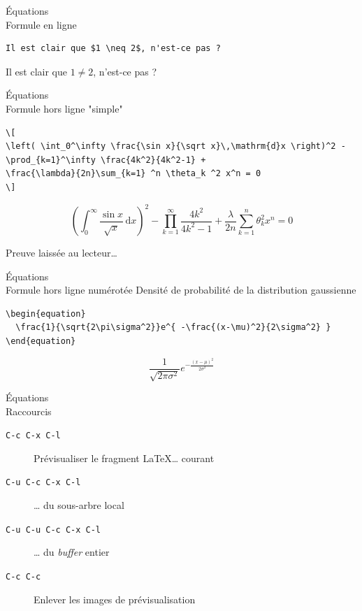 \documentclass[presentation,t,hideothersubsections]{beamer}
\begin{document}
\begin{frame}[fragile,label=sec-3-1-1]{Équations \\ Formule en ligne}
 \lstset{language=org,numbers=none}
\begin{lstlisting}
Il est clair que $1 \neq 2$, n'est-ce pas ?
\end{lstlisting}

Il est clair que $1 \neq 2$, n'est-ce pas ?
\end{frame}
\begin{frame}[fragile,label=sec-3-1-2]{Équations \\ Formule hors ligne "simple"}
 \lstset{language=org,numbers=none}
\begin{lstlisting}
\[
\left( \int_0^\infty \frac{\sin x}{\sqrt x}\,\mathrm{d}x \right)^2 -
\prod_{k=1}^\infty \frac{4k^2}{4k^2-1} +
\frac{\lambda}{2n}\sum_{k=1} ^n \theta_k ^2 x^n = 0
\]
\end{lstlisting}

\[
\left( \int_0^\infty \frac{\sin x}{\sqrt x}\,\mathrm{d}x \right)^2 -
\prod_{k=1}^\infty \frac{4k^2}{4k^2-1} +
\frac{\lambda}{2n}\sum_{k=1} ^n \theta_k ^2 x^n = 0
\]

Preuve laissée au lecteur\ldots{}
\end{frame}
\begin{frame}[fragile,label=sec-3-1-3]{Équations \\ Formule hors ligne numérotée}
 Densité de probabilité de la distribution gaussienne

\lstset{language=org,numbers=none}
\begin{lstlisting}
\begin{equation}
  \frac{1}{\sqrt{2\pi\sigma^2}}e^{ -\frac{(x-\mu)^2}{2\sigma^2} }
\end{equation}
\end{lstlisting}

\begin{equation}
  \frac{1}{\sqrt{2\pi\sigma^2}}e^{ -\frac{(x-\mu)^2}{2\sigma^2} }
\end{equation}
\end{frame}
\begin{frame}[fragile,label=sec-3-1-4]{Équations \\ Raccourcis}
 \begin{description}
\item[\texttt{C-c C-x C-l}] Prévisualiser le fragment \LaTeX{}\ldots{} courant
\item[\texttt{C-u C-c C-x C-l}] \ldots{} du sous-arbre local
\item[\texttt{C-u C-u C-c C-x C-l}] \ldots{} du \emph{buffer} entier
\item[\texttt{C-c C-c}] Enlever les images de prévisualisation
\end{description}
\end{frame}
\end{document}
